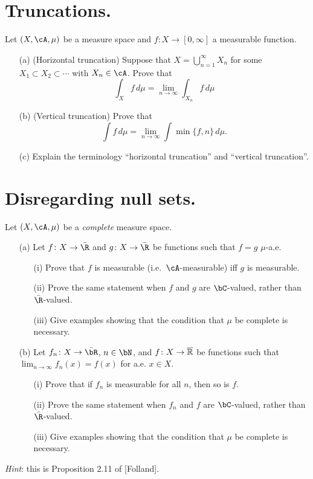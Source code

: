 \documentclass[lang=cn,11pt]{elegantbook}
\begin{document}
\section{Truncations.}
Let $(X,\cA,\mu)$ be a measure space and $f\colon X\to [0, \infty]$ a measurable function.
\begin{itemize}
\item[(a)] (Horizontal truncation) Suppose that $X=\bigcup_{n=1}^\infty X_n$ for some $X_1\subset X_2\subset \cdots$ 
with $X_n\in \cA$. Prove that 
\[
  \int_X f \,d\mu = \lim_{n\to \infty} \int_{X_n} f\,d\mu
\]
\item[(b)] (Vertical truncation)
  Prove that
\[
  \int f\,d\mu = \lim_{n\to \infty} \int \min\{ f,  n\}\,d\mu.
\]
\item[(c)]
  Explain the terminology ``horizontal truncation'' and ``vertical truncation''.
\end{itemize}

\section{Disregarding null sets.}
  Let $(X,\cA,\mu)$ be a \emph{complete} measure space.
  \begin{itemize}
  \item[(a)]
    Let $f\colon X\to\bar\R$ and $g\colon X\to\bar\R$ be functions such that $f=g$ $\mu$-a.e.
    \begin{itemize}
    \item[(i)]
      Prove that $f$ is measurable (i.e.\ $\cA$-measurable) iff $g$ is measurable.
    \item[(ii)]
      Prove the same statement when $f$ and $g$ are $\bC$-valued, rather than
      $\bar\R$-valued.
    \item[(iii)]
      Give examples showing that the condition that $\mu$ be complete is necessary.
    \end{itemize}
  \item[(b)]
    Let $f_n\colon X\to\bar\bR$, $n\in\bN$, and $f\colon X\to \overline{\mathbb{R}}$ be functions such that $\lim_{n\to\infty}f_n(x)=f(x)$ for a.e. $x\in X$. 
    \begin{itemize}
    \item[(i)]
      Prove that if $f_n$ is measurable for all $n$, then so is $f$.
    \item[(ii)]
      Prove the same statement when $f_n$ and $f$ are $\bC$-valued, rather than
      $\bar\R$-valued.
    \item[(iii)]
      Give examples showing that the condition that $\mu$ be complete is necessary.
    \end{itemize}
  \end{itemize}
  \textit{Hint}: this is Proposition 2.11 of [Folland].
  
\end{document}
